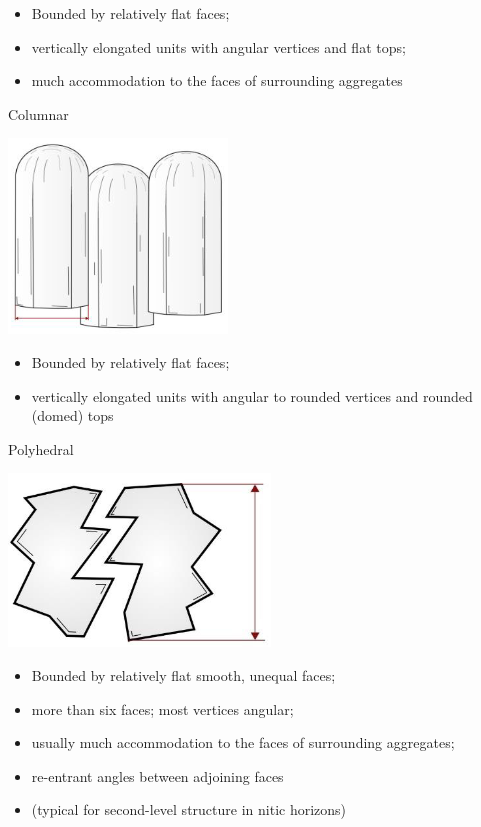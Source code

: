 \documentclass[
  letterpaper,
  DIV=11,
  numbers=noendperiod]{scrreprt}
\providecommand{\tightlist}{%
  \setlength{\itemsep}{0pt}\setlength{\parskip}{0pt}}\usepackage{longtable,booktabs,array}
\begin{document}
\begin{itemize}
\tightlist
\item
  Bounded by relatively flat faces;
\item
  vertically elongated units with angular vertices and flat tops;
\item
  much accommodation to the faces of surrounding aggregates
\end{itemize}

Columnar

\includegraphics{./table_8-41-07.png}

\begin{itemize}
\tightlist
\item
  Bounded by relatively flat faces;
\item
  vertically elongated units with angular to rounded vertices and
  rounded (domed) tops
\end{itemize}

Polyhedral

\includegraphics{./table_8-41-08.png}

\begin{itemize}
\tightlist
\item
  Bounded by relatively flat smooth, unequal faces;
\item
  more than six faces; most vertices angular;
\item
  usually much accommodation to the faces of surrounding aggregates;
\item
  re-entrant angles between adjoining faces
\item
  (typical for second-level structure in nitic horizons)
\end{itemize}
\end{document}

